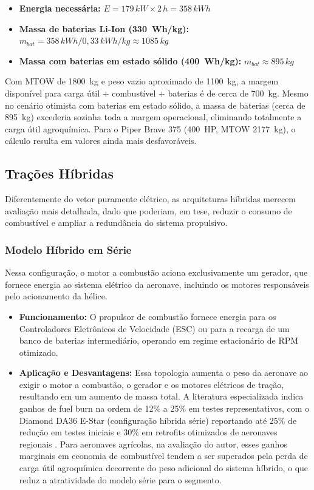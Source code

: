 \documentclass[a4paper,12pt]{article}
\begin{document}
\begin{itemize}
    \item \textbf{Energia necessária:} $E = 179\,\si{kW} \times 2\,\si{h} = 358\,\si{kWh}$
    \item \textbf{Massa de baterias Li-Ion (\SI{330}{Wh/kg}):} $m_{bat} = 358\,\si{kWh} / 0{,}33\,\si{kWh/kg} \approx 1085\,\si{kg}$
    \item \textbf{Massa com baterias em estado sólido (\SI{400}{Wh/kg}):} $m_{bat} \approx 895\,\si{kg}$
\end{itemize}

Com MTOW de \SI{1800}{kg} e peso vazio aproximado de \SI{1100}{kg}, a margem disponível para carga útil + combustível + baterias é de cerca de \SI{700}{kg}. Mesmo no cenário otimista com baterias em estado sólido, a massa de baterias (cerca de \SI{895}{kg}) excederia sozinha toda a margem operacional, eliminando totalmente a carga útil agroquímica. Para o Piper Brave 375 (\SI{400}{HP}, MTOW \SI{2177}{kg}), o cálculo resulta em valores ainda mais desfavoráveis.

\subsection{Trações Híbridas}

Diferentemente do vetor puramente elétrico, as arquiteturas híbridas merecem avaliação mais detalhada, dado que poderiam, em tese, reduzir o consumo de combustível e ampliar a redundância do sistema propulsivo.

\subsubsection{Modelo Híbrido em Série}
Nessa configuração, o motor a combustão aciona exclusivamente um gerador, que fornece energia ao sistema elétrico da aeronave, incluindo os motores responsáveis pelo acionamento da hélice.

\begin{itemize}
    \item \textbf{Funcionamento:} O propulsor de combustão fornece energia para os Controladores Eletrônicos de Velocidade (ESC) ou para a recarga de um banco de baterias intermediário, operando em regime estacionário de RPM otimizado.
    \item \textbf{Aplicação e Desvantagens:} Essa topologia aumenta o peso da aeronave ao exigir o motor a combustão, o gerador e os motores elétricos de tração, resultando em um aumento de massa total. A literatura especializada indica ganhos de fuel burn na ordem de 12\% a 25\% em testes representativos, com o Diamond DA36 E-Star (configuração híbrida série) reportando até 25\% de redução em testes iniciais e 30\% em retrofits otimizados de aeronaves regionais \cite{wiki_hybrid_electric, sciencedirect_hybrid}. Para aeronaves agrícolas, na avaliação do autor, esses ganhos marginais em economia de combustível tendem a ser superados pela perda de carga útil agroquímica decorrente do peso adicional do sistema híbrido, o que reduz a atratividade do modelo série para o segmento.
\end{itemize}
\end{document}

